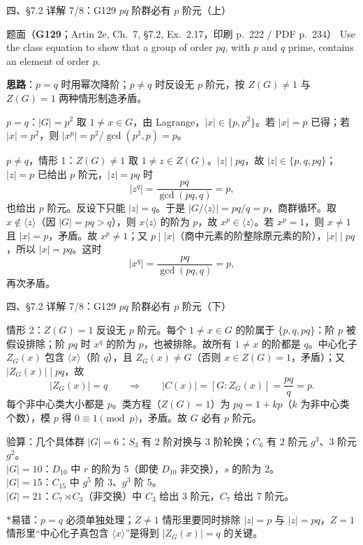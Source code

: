 \documentclass[aspectratio=169,10pt,fontset=none]{ctexbeamer}
\newcommand{\ex}[1]{\textcolor{accent}{\footnotesize\bfseries #1}}
\newcommand{\key}[1]{\textcolor{ink}{\bfseries #1}}
\newcommand{\starpt}{\textcolor{accent}{\bfseries$\ast$}}
\begin{document}
\begin{frame}[t]{四、\S7.2 详解 7/8：G129 $pq$ 阶群必有 $p$ 阶元（上）}
\label{ex:G129}
\scriptsize
\begin{block}{\footnotesize 题面（\ex{G129}；Artin 2e, Ch.~7, \S7.2, Ex.~2.17，印刷 p.~222 / PDF p.~234）}
Use the class equation to show that a group of order $pq$, with $p$ and $q$ prime, contains an element of order $p$.
\end{block}
\key{思路}：$p=q$ 时用幂次降阶；$p\ne q$ 时反设无 $p$ 阶元，按 $Z(G)\ne1$ 与 $Z(G)=1$ 两种情形制造矛盾。
\begin{block}{\footnotesize $p=q$：$|G|=p^2$}
取 $1\ne x\in G$，由 Lagrange，$|x|\in\{p,p^2\}$。若 $|x|=p$ 已得；若 $|x|=p^2$，则 $|x^p|=p^2/\gcd(p^2,p)=p$。
\end{block}
\begin{block}{\footnotesize $p\ne q$，情形 1：$Z(G)\ne1$}
取 $1\ne z\in Z(G)$。$|z|\mid pq$，故 $|z|\in\{p,q,pq\}$；$|z|=p$ 已给出 $p$ 阶元，$|z|=pq$ 时
\[
|z^q|=\frac{pq}{\gcd(pq,q)}=p,
\]
也给出 $p$ 阶元。反设下只能 $|z|=q$。于是 $|G/\langle z\rangle|=pq/q=p$，商群循环。取 $x\notin\langle z\rangle$（因 $|G|=pq>q$），则 $x\langle z\rangle$ 的阶为 $p$，故 $x^p\in\langle z\rangle$。若 $x^p=1$，则 $x\ne1$ 且 $|x|=p$，矛盾。故 $x^p\ne1$；又 $p\mid|x|$（商中元素的阶整除原元素的阶），$|x|\mid pq$，所以 $|x|=pq$。这时
\[
|x^q|=\frac{pq}{\gcd(pq,q)}=p,
\]
再次矛盾。
\end{block}
\end{frame}

\begin{frame}[t]{四、\S7.2 详解 7/8：G129 $pq$ 阶群必有 $p$ 阶元（下）}
\scriptsize
\begin{block}{\footnotesize 情形 2：$Z(G)=1$}
反设无 $p$ 阶元。每个 $1\ne x\in G$ 的阶属于 $\{p,q,pq\}$：阶 $p$ 被假设排除；阶 $pq$ 时 $x^q$ 的阶为 $p$，也被排除。故所有 $1\ne x$ 的阶都是 $q$。中心化子 $Z_G(x)$ 包含 $\langle x\rangle$（阶 $q$），且 $Z_G(x)\ne G$（否则 $x\in Z(G)=1$，矛盾）；又 $|Z_G(x)|\mid pq$，故
\[
|Z_G(x)|=q\qquad\Longrightarrow\qquad |C(x)|=[G:Z_G(x)]=\frac{pq}{q}=p.
\]
每个非中心类大小都是 $p$。类方程（$Z(G)=1$）为 $pq=1+kp$（$k$ 为非中心类个数），模 $p$ 得 $0\equiv1\pmod p$，矛盾。故 $G$ 必有 $p$ 阶元。
\end{block}
\begin{block}{\footnotesize 验算：几个具体群}
$|G|=6$：$S_3$ 有 2 阶对换与 3 阶轮换；$C_6$ 有 2 阶元 $g^3$、3 阶元 $g^2$。\\
$|G|=10$：$D_{10}$ 中 $r$ 的阶为 5（即使 $D_{10}$ 非交换），$s$ 的阶为 2。\\
$|G|=15$：$C_{15}$ 中 $g^5$ 阶 3、$g^3$ 阶 5。\\
$|G|=21$：$C_7\rtimes C_3$（非交换）中 $C_3$ 给出 3 阶元，$C_7$ 给出 7 阶元。
\end{block}
\footnotesize\color{ink!80}
\starpt 易错：$p=q$ 必须单独处理；$Z\ne1$ 情形里要同时排除 $|z|=p$ 与 $|z|=pq$，$Z=1$ 情形里“中心化子真包含 $\langle x\rangle$”是得到 $|Z_G(x)|=q$ 的关键。
\end{frame}
\end{document}
